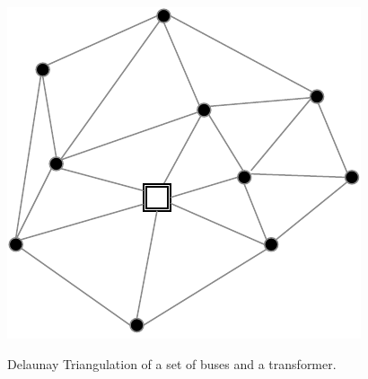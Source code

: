 \begin{figure}[h]
	\begin{centering}
		{\includegraphics[scale=0.7]{figures/background/tri.pdf}}
		\caption[Delaunay Triangulation]{Delaunay Triangulation of a set of buses and a transformer.}
		\label{fig:tri}
	\end{centering}
\end{figure}
